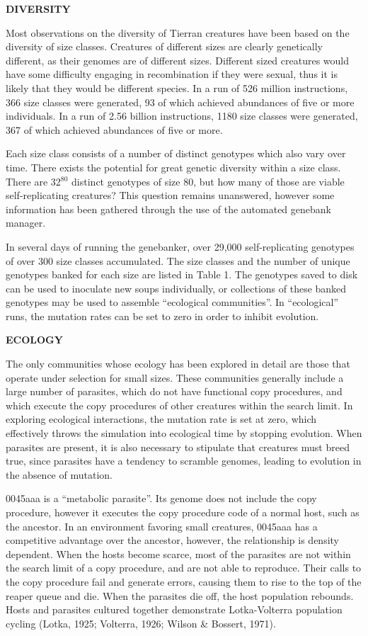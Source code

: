 \LP
\bf DIVERSITY\rm
\eLP

Most observations on the diversity of Tierran creatures have been based on
the diversity of size classes.  Creatures of different sizes are clearly
genetically different, as their genomes are of different sizes.  Different
sized creatures would have some difficulty engaging in recombination if they
were sexual, thus it is likely that they would be different species.
In a run of 526 million instructions, 366 size classes were generated, 93
of which achieved abundances of five or more individuals.  In a run of
2.56 billion instructions, 1180 size classes were generated, 367 of which
achieved abundances of five or more.

Each size class consists of a number of distinct genotypes which also vary
over time.  There exists the potential for great genetic diversity within a
size class.  There are 32$^{80}$ distinct genotypes of size 80, but how many
of those are viable self-replicating creatures?  This question remains
unanswered, however some information has been gathered through the use
of the automated genebank manager.

In several days of running the genebanker, over 29,000 self-replicating
genotypes of over 300 size classes accumulated.  The size classes and
the number of unique genotypes banked for each size are listed in Table 1.
The genotypes saved to disk can be used to inoculate new soups individually,
or collections of these banked genotypes may be used to assemble ``ecological
communities''.  In ``ecological'' runs, the mutation rates can be set to zero
in order to inhibit evolution.

\LP
\bf ECOLOGY\rm
\eLP

The only communities whose ecology has been explored in detail are those
that operate under selection for small sizes.  These communities generally
include a large number of parasites, which do not have functional copy
procedures, and which execute the copy procedures of other creatures within
the search limit.  In exploring ecological interactions, the mutation rate
is set at zero, which effectively throws the simulation into ecological time
by stopping evolution.  When parasites are present, it is also necessary
to stipulate that creatures must breed true, since parasites have a tendency
to scramble genomes, leading to evolution in the absence of mutation.

0045aaa is a ``metabolic parasite''.  Its genome does not include the
copy procedure, however it executes the copy procedure code of
a normal host, such as the ancestor.  In an environment favoring small
creatures, 0045aaa has a competitive advantage over the ancestor, however, the
relationship is density dependent.  When the hosts become scarce, most of
the parasites are not within the search limit of a copy procedure, and are
not able to reproduce.  Their calls to the copy procedure fail and generate
errors, causing them to rise to the top of the reaper queue and die.
When the parasites die off, the host population rebounds.  Hosts and parasites
cultured together demonstrate Lotka-Volterra population cycling (Lotka, 1925;
Volterra, 1926; Wilson \& Bossert, 1971).

